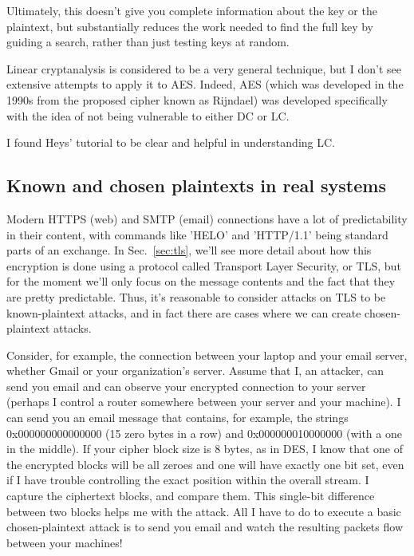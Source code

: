 Ultimately, this doesn't give you complete information about the key
or the plaintext, but substantially reduces the work needed to find
the full key by guiding a search, rather than just testing keys at
random.

Linear cryptanalysis is considered to be a very general technique, but
I don't see extensive attempts to apply it to AES.  Indeed, AES (which
was developed in the 1990s from the proposed cipher known as Rijndael)
was developed specifically with the idea of not being vulnerable to
either DC or LC.

I found Heys' tutorial to be clear and helpful in understanding LC.

\subsection{Known and chosen plaintexts in real systems}



Modern HTTPS (web) and SMTP (email) connections have a lot of
predictability in their content, with commands like 'HELO' and
'HTTP/1.1' being standard parts of an exchange.  In
Sec.~\ref{sec:tls}, we'll see more detail about how this encryption is
done using a protocol called Transport Layer Security, or TLS, but for
the moment we'll only focus on the message contents and the fact that
they are pretty predictable.  Thus, it's reasonable to consider
attacks on TLS to be known-plaintext attacks, and in fact there are
cases where we can create chosen-plaintext attacks.

Consider, for example, the connection between your laptop and your
email server, whether Gmail or your organization's server.  Assume
that I, an attacker, can send you email and can observe your encrypted
connection to your server (perhaps I control a router somewhere
between your server and your machine).  I can send you an email
message that contains, for example, the strings 0x000000000000000 (15
zero bytes in a row) and 0x000000010000000 (with a one in the middle).
If your cipher block size is 8 bytes, as in DES, I know that one of
the encrypted blocks will be all zeroes and one will have exactly one
bit set, even if I have trouble controlling the exact position within
the overall stream.  I capture the ciphertext blocks, and compare
them.  This single-bit difference between two blocks helps me with the
attack.  All I have to do to execute a basic chosen-plaintext attack
is to send you email and watch the resulting packets flow between your
machines!

